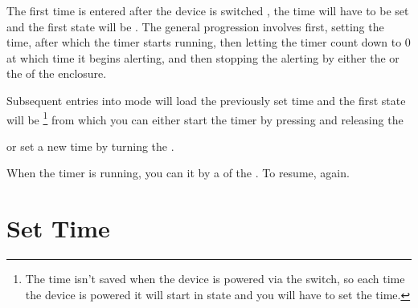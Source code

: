 The first time  is entered after the device is switched , the
time will have to be set and the first state will be .  The general
progression involves first, setting the time, after which the timer starts
running, then letting the timer count down to \num{0} at which time it begins
alerting, and then stopping the alerting by either  the
 or  the  of the enclosure.

\tabcolsep=10pt
\tabcolsep=12pt


Subsequent entries into  mode will load the previously set time and the
first state will be \footnote{ The time isn't saved when the device is
powered  via the  switch, so each time the device is powered
 it will start in  state and you will have to set the time.}
from which you can either start the timer by pressing and releasing the 


or set a new time by turning the .


When the timer is running, you can  it by a  of the .
To resume,  again.


\section{Set Time}

